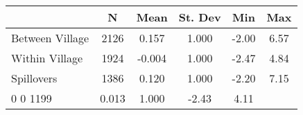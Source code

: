\begin{tabular}{l*{5}{c}}\hline&\multicolumn{1}{c}{N}&\multicolumn{1}{c}{Mean}&\multicolumn{1}{c}{St. Dev}&\multicolumn{1}{c}{Min}&\multicolumn{1}{c}{Max}\\ \hline 
Between Village & 2126 & 0.157 & 1.000 & -2.00 & 6.57 \\
Within Village & 1924 & -0.004 & 1.000 & -2.47 & 4.84 \\
Spillovers & 1386 & 0.120 & 1.000 & -2.20 & 7.15 \\
0 0 1199 & 0.013 & 1.000 & -2.43 & 4.11 \\
\hline \end{tabular}
